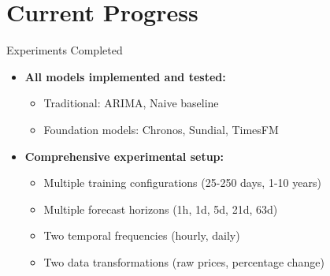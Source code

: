 \documentclass[aspectratio=169]{beamer}
\begin{document}
\section{Current Progress}

\begin{frame}{Experiments Completed}
\begin{itemize}
\item \textbf{All models implemented and tested:}
\begin{itemize}
\item Traditional: ARIMA, Naive baseline
\item Foundation models: Chronos, Sundial, TimesFM
\end{itemize}

\vspace{0.5em}

\item \textbf{Comprehensive experimental setup:}
\begin{itemize}
\item Multiple training configurations (25-250 days, 1-10 years)
\item Multiple forecast horizons (1h, 1d, 5d, 21d, 63d)
\item Two temporal frequencies (hourly, daily)
\item Two data transformations (raw prices, percentage change)
\end{itemize}

\vspace{0.5em}

\end{itemize}


\end{frame}
\end{document}
